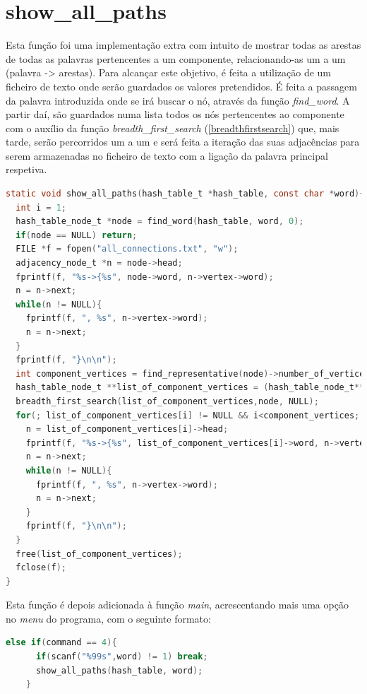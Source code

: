 	\section{show\_all\_paths}
	\label{showallpaths}
	Esta função foi uma implementação extra com intuito de mostrar todas as arestas de todas as palavras pertencentes a um componente, relacionando-as um a um (palavra -> {arestas}).
Para alcançar este objetivo, é feita a utilização de um ficheiro de texto onde serão guardados os valores pretendidos.
É feita a passagem da palavra introduzida onde se irá buscar o nó, através da função \textit{find\_word}. A partir daí, são guardados numa lista todos os nós pertencentes ao componente com o auxílio da função \textit{breadth\_first\_search} (\ref{breadthfirstsearch}) que, mais tarde, serão percorridos um a um e será feita a iteração das suas adjacências para 
serem armazenadas no ficheiro de texto com a ligação da palavra principal respetiva.\\
	\begin{lstlisting}[language=C]
static void show_all_paths(hash_table_t *hash_table, const char *word){
  int i = 1;
  hash_table_node_t *node = find_word(hash_table, word, 0);
  if(node == NULL) return;
  FILE *f = fopen("all_connections.txt", "w");
  adjacency_node_t *n = node->head;
  fprintf(f, "%s->{%s", node->word, n->vertex->word);
  n = n->next;
  while(n != NULL){
    fprintf(f, ", %s", n->vertex->word);
    n = n->next;
  }
  fprintf(f, "}\n\n");
  int component_vertices = find_representative(node)->number_of_vertices;
  hash_table_node_t **list_of_component_vertices = (hash_table_node_t**)malloc(sizeof(hash_table_node_t) * component_vertices);
  breadth_first_search(list_of_component_vertices,node, NULL); 
  for(; list_of_component_vertices[i] != NULL && i<component_vertices; i++){
    n = list_of_component_vertices[i]->head;
    fprintf(f, "%s->{%s", list_of_component_vertices[i]->word, n->vertex->word);
    n = n->next;
    while(n != NULL){
      fprintf(f, ", %s", n->vertex->word);
      n = n->next;
    }
    fprintf(f, "}\n\n");
  }
  free(list_of_component_vertices);
  fclose(f);
}
	\end{lstlisting}
	Esta função é depois adicionada à função \textit{main}, acrescentando mais uma opção no \textit{menu} do programa, com o seguinte formato:
	\begin{lstlisting}[language=C]
else if(command == 4){
      if(scanf("%99s",word) != 1) break;
      show_all_paths(hash_table, word);
    }
	\end{lstlisting}
